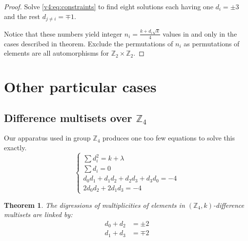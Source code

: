 \documentclass{article}
\theoremstyle{plain}
\newtheorem{theorem}{Theorem}[section]
\theoremstyle{definition}
\theoremstyle{remark}
\begin{document}
		\begin{proof}
			Solve \eqref{v4:eq:constraints} to find eight solutions each having one $d_i = \pm 3$ and the rest $d_{j \neq i} = \mp 1$.
			
			Notice that these numbers yield integer $n_i = \frac{k+d_i \sqrt k}4$ values in and only in the cases described in theorem. Exclude the permutations of $n_i$ as permutations of elements are all automorphisms for $\mathbb Z_2 \times \mathbb Z_2$.
		\end{proof}
	
	\section{Other particular cases}
		\subsection{Difference multisets over $\mathbb Z_4$}
			Our apparatus used in group $\mathbb Z_4$ produces one too few equations to solve this exactly.
			\begin{equation}
				\label{other:z4:eq:constraints}
				\begin{cases}
					\sum d_i^2 = k + \lambda \\
					\sum d_i = 0 \\
					d_0 d_1 + d_1 d_2 + d_2 d_3 + d_3 d_0 = -4 \\
					2 d_0 d_2 + 2 d_1 d_3 = -4
				\end{cases}
			\end{equation}
			
			\begin{theorem}
				The digressions of multiplicities of elements in $(\mathbb Z_4, k)$-difference multisets are linked by:
				\begin{equation}
					\begin{split}
						d_0 + d_2 &=\pm 2 \\
						d_1 + d_3 &= \mp 2
					\end{split}
				\end{equation}
			\end{theorem}
			
\end{document}
